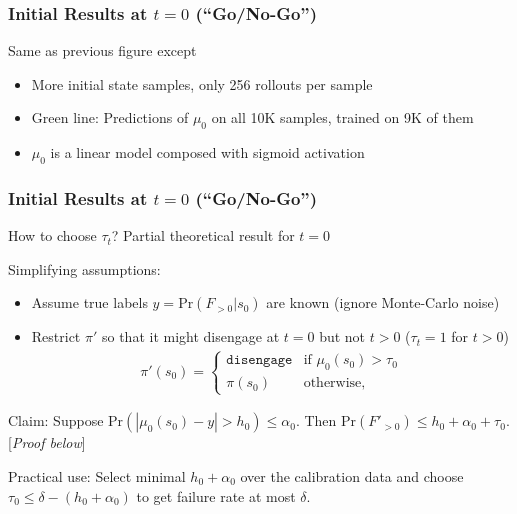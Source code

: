 \documentclass[handout]{beamer}
\begin{document}
\begin{frame}
    \frametitle{Initial Results at $t=0$ (``Go/No-Go'')}

    Same as previous figure except
    \begin{itemize}
    \item More initial state samples, only 256 rollouts per sample
    \item Green line: Predictions of $\mu_0$ on all 10K samples, trained on 9K of them
    \item $\mu_0$ is a linear model composed with sigmoid activation
    \end{itemize}

\end{frame}

\begin{frame}
    \frametitle{Initial Results at $t=0$ (``Go/No-Go'')}

    How to choose $\tau_t$? Partial theoretical result for $t=0$

    \vspace{1em}

    Simplifying assumptions:
    \begin{itemize}
    \item Assume true labels $y = \text{Pr}(F_{>0}|s_0)$ are known (ignore Monte-Carlo noise)
    \item Restrict $\pi'$ so that it might disengage at $t=0$ but not $t > 0$ ($\tau_t = 1$ for $t > 0$)
        \begin{align*}
            \pi'(s_0) = \begin{cases}
                \texttt{disengage} & \text{if } \mu_0(s_0) > \tau_0 \\
                \pi(s_0) & \text{otherwise,}
            \end{cases}
        \end{align*}
    \end{itemize}
    Claim: Suppose $\text{Pr}(|\mu_0(s_0) - y| > h_0) \leq \alpha_0$.  Then $\text{Pr}(F'_{>0}) \leq h_0 + \alpha_0 + \tau_0$. [\textit{Proof below}]

    \vspace{1em}

    Practical use: Select minimal $h_0 + \alpha_0$ over the calibration data and choose $\tau_0 \leq \delta - (h_0 + \alpha_0)$ to get failure rate at most $\delta$.

\end{frame}
\end{document}

